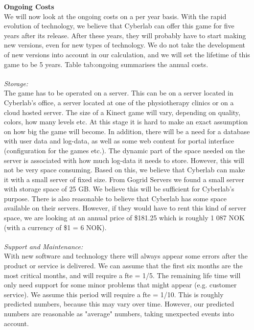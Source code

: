 \newpage
\textbf{Ongoing Costs}\\
We will now look at the ongoing costs on a per year basis. With the rapid evolution of technology, we believe that Cyberlab can offer this game for five years after its release. After these years, they will probably have to start making new versions, even for new types of technology. We do not take the development of new versions into account in our calculation, and we will set the lifetime of this game to be 5 years. Table {tab:ongoing} summarises the annual costs. \\ \\
\emph{Storage:}\\
The game has to be operated on a server. This can be on a server located in Cyberlab’s office, a server located at one of the physiotherapy clinics or on a cloud hosted server. The size of a Kinect game will vary, depending on quality, colors, how many levels etc. At this stage it is hard to make an exact assumption on how big the game will become. In addition, there will be a need for a database with user data and log-data, as well as some web content for portal interface (configuration for the games etc.). The dynamic part of the space needed on the server is associated with how much log-data it needs to store. However, this will not be very space consuming. Based on this, we believe that Cyberlab can make it with a small server of fixed size. From Gogrid Servers \cite{priceserver} we found a small server with storage space of 25 GB. We believe this will be sufficient for Cyberlab's purpose. There is also reasonable to believe that Cyberlab has some space available on their servers. However, if they would have to rent this kind of server space, we are looking at an annual price of \$181.25 which is roughly 1 087 NOK (with a currency of \$1 = 6 NOK).\\ \\
\emph{Support and Maintenance:}\\
With new software and technology there will always appear some errors after the product or service is delivered. We can assume that the first six months are the most critical months, and will require a \ac{fte} = 1/5. The remaining life time will only need support for some minor problems that might appear (e.g. customer service). We assume this period will require a \ac{fte} = 1/10. This is roughly predicted numbers, because this may vary over time. However, our predicted numbers are reasonable as "average" numbers, taking unexpected events into account.  \\ \\

